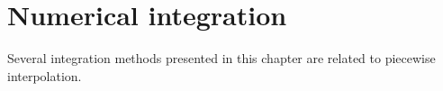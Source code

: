 \chapter{Numerical integration}
\label{cha:quadrature}

Several integration methods presented in this chapter are related to piecewise interpolation.

